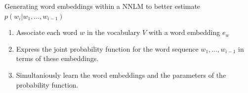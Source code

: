 \documentclass[11pt, a4paper, landscape]{article}
\begin{document}
\NewPage{} 

\vfill
Generating word embeddings within a NNLM to better estimate $p(w_i | w_1,\dots,w_{i-1})$
\begin{enumerate}
\item Associate each word $w$ in the vocabulary $V$ with a word embedding $e_w$
\item Express the joint probability function for the word sequence $w_1,\dots,w_{i-1}$ in terms of these embeddings.
\item Simultaniously learn the word embeddings and the parameters of the probability function.
\end{enumerate}
\vfill


\NewPage{}
\hypertarget{sli:simple}{}
\end{document}
